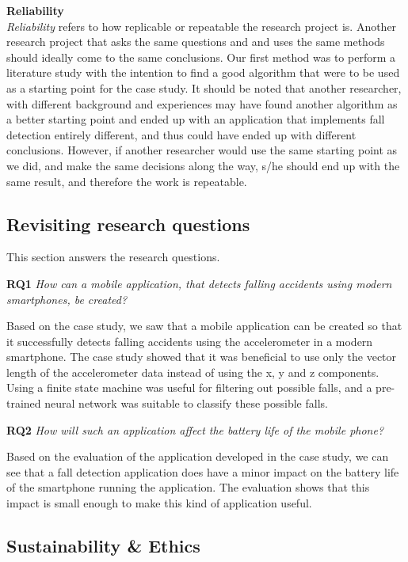 \documentclass[12pt, a4paper, onecolumn]{article}
\newcommand{\parag}[1]{
	\textbf{#1} \hspace{0pt} \\
}
\begin{document}
	\parag{Reliability}
	\textit{Reliability} refers to how replicable or repeatable the research project is. Another research project that asks the same questions and and uses the same methods should ideally come to the same conclusions. Our first method was to perform a literature study with the intention to find a good algorithm that were to be used as a starting point for the case study. It should be noted that another researcher, with different background and experiences may have found another algorithm as a better starting point and ended up with an application that implements fall detection entirely different, and thus could have ended up with different conclusions. However, if another researcher would use the same starting point as we did, and make the same decisions along the way, s/he should end up with the same result, and therefore the work is repeatable.
	
	\subsection{Revisiting research questions}
	
	This section answers the research questions.
	
	\textbf{RQ1} \textit{How can a mobile application, that detects falling accidents using modern smartphones, be created?}
	
	Based on the case study, we saw that a mobile application can be created so that it successfully detects falling accidents using the accelerometer in a modern smartphone. The case study showed that it was beneficial to use only the vector length of the accelerometer data instead of using the x, y and z components. Using a finite state machine was useful for filtering out possible falls, and a pre-trained neural network was suitable to classify these possible falls.
	
	\textbf{RQ2} \textit{How will such an application affect the battery life of the mobile phone?}
	
	Based on the evaluation of the application developed in the case study, we can see that a fall detection application does have a minor impact on the battery life of the smartphone running the application. The evaluation shows that this impact is small enough to make this kind of application useful.
	
	\subsection{Sustainability \& Ethics}
	
\end{document}
